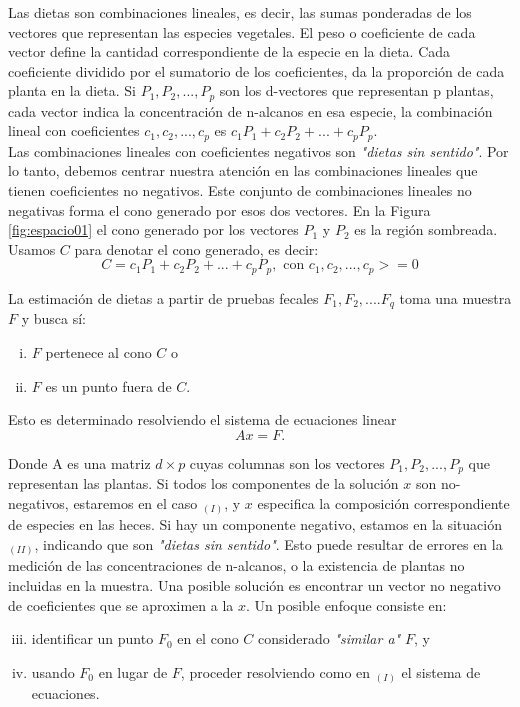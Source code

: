 Las dietas son combinaciones lineales, es decir, las sumas ponderadas de los vectores que representan las especies vegetales. El peso o coeficiente de cada vector define la cantidad correspondiente de la especie en la dieta. Cada coeficiente dividido  por el sumatorio de los coeficientes, da la proporción de cada planta en la dieta. Si $P_1, P_2, ..., P_p$ son los d-vectores que representan p plantas, cada vector indica la concentración de n-alcanos en esa especie, la combinación lineal con coeficientes $c_1,c_2, ... , c_p$ es $c_1 P_1 + c_2 P_2 + ... + c_p P_p$. \\
Las combinaciones lineales con coeficientes negativos son \textit{"dietas sin sentido"}. Por lo tanto, debemos centrar nuestra atención en las combinaciones lineales que tienen coeficientes no negativos. Este conjunto de combinaciones lineales no negativas forma el cono generado por esos dos vectores. En la Figura \ref{fig:espacio01} el cono generado por los vectores $P_1$ y $P_2$ es la región sombreada. Usamos $C$ para denotar el cono generado, es decir: $$ C = { c_1 P_1 + c_2 P_2 + ... + c_p P_p, \text{ con } c_1,c_2,...,c_p >=0} $$

La estimación de dietas a partir de pruebas fecales $F_1, F_2, ... . F_q $ toma una muestra $F$ y busca sí:

\begin{enumerate}[(i)]
\item $F$ pertenece al cono $C$ o
\item $F$ es un punto fuera de $C$.
\end{enumerate}

Esto es determinado resolviendo el sistema de ecuaciones linear $$Ax=F.$$

Donde A es una matriz $d \times p$ cuyas columnas son los vectores $P_1, P_2 , ... , P_p$ que representan las plantas. Si todos los componentes de la solución $x$ son no-negativos, estaremos en el caso $_{(I)}$, y $x$ especifica la composición correspondiente de especies en las heces. Si hay un componente negativo, estamos en la situación $_{(II)}$, indicando que son \textit{"dietas sin sentido"}. Esto puede resultar de errores en la medición de las concentraciones de n-alcanos, o la existencia de plantas no incluidas en la muestra. Una posible solución es encontrar un vector no negativo de coeficientes que se aproximen a la $x$. Un posible enfoque consiste en:

\begin{enumerate}[(i)]
\setcounter{enumi}{2}
\item identificar un punto $F_0$ en el cono $C$ considerado \textit{"similar a"} $F$, y
\item usando $F_0$ en lugar de $F$, proceder resolviendo como en $_{(I)}$ el sistema de ecuaciones.
\end{enumerate}

